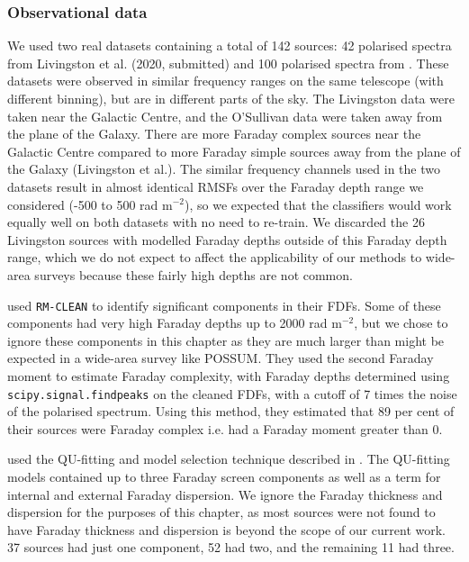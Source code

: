   \subsubsection{Observational data}
  \label{sec:faraday-observational-data}

    We used two real datasets containing a total of 142 sources: 42 polarised spectra from Livingston et al. (2020, submitted) and 100 polarised spectra from \citet{osullivan_broad-band_2017}. These datasets were observed in similar frequency ranges on the same telescope (with different binning), but are in different parts of the sky. The Livingston data were taken near the Galactic Centre, and the O'Sullivan data were taken away from the plane of the Galaxy. There are more Faraday complex sources near the Galactic Centre compared to more Faraday simple sources away from the plane of the Galaxy (Livingston et al.). The similar frequency channels used in the two datasets result in almost identical RMSFs over the Faraday depth range we considered (-500 to 500 rad m$^{-2}$), so we expected that the classifiers would work equally well on both datasets with no need to re-train. We discarded the 26 Livingston sources with modelled Faraday depths outside of this Faraday depth range, which we do not expect to affect the applicability of our methods to wide-area surveys because these fairly high depths are not common.

    \citet{livingston21faraday} used \texttt{RM-CLEAN} \citep{heald09faraday} to identify significant components in their FDFs. Some of these components had very high Faraday depths up to 2000 rad m$^{-2}$, but we chose to ignore these components in this chapter as they are much larger than might be expected in a wide-area survey like POSSUM. They used the second Faraday moment \citep{brown11report} to estimate Faraday complexity, with Faraday depths determined using \texttt{scipy.signal.find\textunderscore{}peaks} on the cleaned FDFs, with a cutoff of 7 times the noise of the polarised spectrum. Using this method, they estimated that 89 per cent of their sources were Faraday complex i.e. had a Faraday moment greater than 0.

    \citet{osullivan_broad-band_2017} used the QU-fitting and model selection technique described in \citet{osullivan12agn}. The QU-fitting models contained up to three Faraday screen components as well as a term for internal and external Faraday dispersion. We ignore the Faraday thickness and dispersion for the purposes of this chapter, as most sources were not found to have Faraday thickness and dispersion is beyond the scope of our current work. 37 sources had just one component, 52 had two, and the remaining 11 had three.

